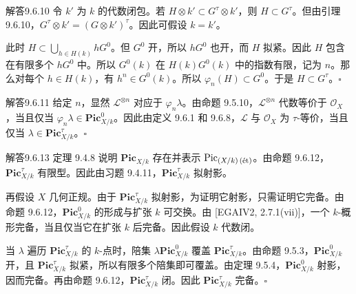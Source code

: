 \begin{origstatement}{解答}{9.6.10}\label{appA:ans9610}
令 $k'$ 为 $k$ 的代数闭包。若 $H\otimes k'\subset G^\tau\otimes k'$，则 $H\subset G^\tau$。但由引理 9.6.10，$G^\tau\otimes k'=(G\otimes k')^\tau$。因此可假设 $k=k'$。

此时 $H\subset\bigcup_{h\in H(k)}hG^0$。但 $G^0$ 开，所以 $hG^0$ 也开，而 $H$ 拟紧。因此 $H$ 包含在有限多个 $hG^0$ 中。所以 $G^0(k)$ 在 $H(k)G^0(k)$ 中的指数有限，记为 $n$。那么对每个 $h\in H(k)$，有 $h^n\in G^0(k)$。所以 $\varphi_n(H)\subset G^0$。于是 $H\subset G^\tau$。\hfill$\square$
\end{origstatement}

\begin{origstatement}{解答}{9.6.11}\label{appA:ans9611}
给定 $n$，显然 $\mathcal L^{\otimes n}$ 对应于 $\varphi_n\lambda$。由命题 9.5.10，$\mathcal L^{\otimes n}$ 代数等价于 $\mathcal O_X$，当且仅当 $\varphi_n\lambda\in\mathbf{Pic}_{X/k}^0$。因此由定义 9.6.1 和 9.6.8，$\mathcal L$ 与 $\mathcal O_X$ 为 $\tau$-等价，当且仅当 $\lambda\in\mathbf{Pic}_{X/k}^\tau$。\hfill$\square$
\end{origstatement}

\begin{origstatement}{解答}{9.6.13}\label{appA:ans9613}
定理 9.4.8 说明 $\mathbf{Pic}_{X/k}$ 存在并表示 $\operatorname{Pic}_{(X/k)\,(\text{ét})}$。由命题 9.6.12，$\mathbf{Pic}_{X/k}^\tau$ 有限型。因此由习题 9.4.11，$\mathbf{Pic}_{X/k}^\tau$ 拟射影。

再假设 $X$ 几何正规。由于 $\mathbf{Pic}_{X/k}^\tau$ 拟射影，为证明它射影，只需证明它完备。由命题 9.6.12，$\mathbf{Pic}_{X/k}^0$ 的形成与扩张 $k$ 可交换。由 [EGAIV2, 2.7.1(vii)]，一个 $k$-概形完备，当且仅当它在扩张 $k$ 后完备。因此假设 $k$ 代数闭。

当 $\lambda$ 遍历 $\mathbf{Pic}_{X/k}^\tau$ 的 $k$-点时，陪集 $\lambda\mathbf{Pic}_{X/k}^0$ 覆盖 $\mathbf{Pic}_{X/k}^\tau$。由命题 9.5.3，$\mathbf{Pic}_{X/k}^0$ 开，且 $\mathbf{Pic}_{X/k}^\tau$ 拟紧，所以有限多个陪集即可覆盖。由定理 9.5.4，$\mathbf{Pic}_{X/k}^0$ 射影，因而完备。再由命题 9.6.12，$\mathbf{Pic}_{X/k}^\tau$ 闭。因此 $\mathbf{Pic}_{X/k}^\tau$ 完备。\hfill$\square$
\end{origstatement}

